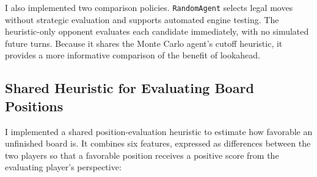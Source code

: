\documentclass[12pt,twoside]{article}
\begin{document}
I also implemented two comparison policies. \texttt{RandomAgent} selects legal
moves without strategic evaluation and supports automated engine testing. The
heuristic-only opponent evaluates each candidate immediately, with no simulated
future turns. Because it shares the Monte Carlo agent's cutoff heuristic, it
provides a more informative comparison of the benefit of lookahead.

\subsection{Shared Heuristic for Evaluating Board Positions}

I implemented a shared position-evaluation heuristic to estimate how favorable
an unfinished board is. It combines six features, expressed as differences
between the two players so that a favorable position receives a positive score
from the evaluating player's perspective:
\end{document}
